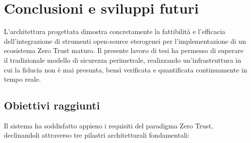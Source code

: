 \section{Conclusioni e sviluppi futuri}
\label{sec:conclusioni}
\thispagestyle{plain}

L'architettura progettata dimostra concretamente la fattibilità e l'efficacia dell'integrazione di strumenti open-source eterogenei per l'implementazione di un ecosistema Zero Trust maturo. Il presente lavoro di tesi ha permesso di superare il tradizionale modello di sicurezza perimetrale, realizzando un'infrastruttura in cui la fiducia non è mai presunta, bensì verificata e quantificata continuamente in tempo reale.

\subsection{Obiettivi raggiunti}
Il sistema ha soddisfatto appieno i requisiti del paradigma Zero Trust, declinandoli attraverso tre pilastri architetturali fondamentali:

